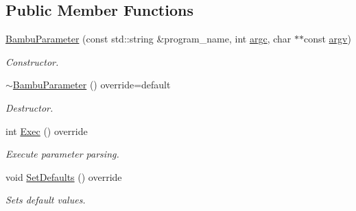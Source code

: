 \subsection*{Public Member Functions}
\begin{DoxyCompactItemize}
\item 
\hyperlink{classBambuParameter_ac737f6a4cfdf92d143ad2c2b14b31ace}{Bambu\+Parameter} (const std\+::string \&program\+\_\+name, int \hyperlink{classParameter_a76b21c2ed27f73883401229217020814}{argc}, char $\ast$$\ast$const \hyperlink{classParameter_a538da2e132ca91996baa116097d6238f}{argv})
\begin{DoxyCompactList}\small\item\em Constructor. \end{DoxyCompactList}\item 
\hyperlink{classBambuParameter_affa28e0f3eec008d304dc1d96550b8ea}{$\sim$\+Bambu\+Parameter} () override=default
\begin{DoxyCompactList}\small\item\em Destructor. \end{DoxyCompactList}\item 
int \hyperlink{classBambuParameter_ad89abd3e8793ce6f8324d3acc74b2faa}{Exec} () override
\begin{DoxyCompactList}\small\item\em Execute parameter parsing. \end{DoxyCompactList}\item 
void \hyperlink{classBambuParameter_a248447b97f9e6302fc1a356d1a34333e}{Set\+Defaults} () override
\begin{DoxyCompactList}\small\item\em Sets default values. \end{DoxyCompactList}\end{DoxyCompactItemize}
